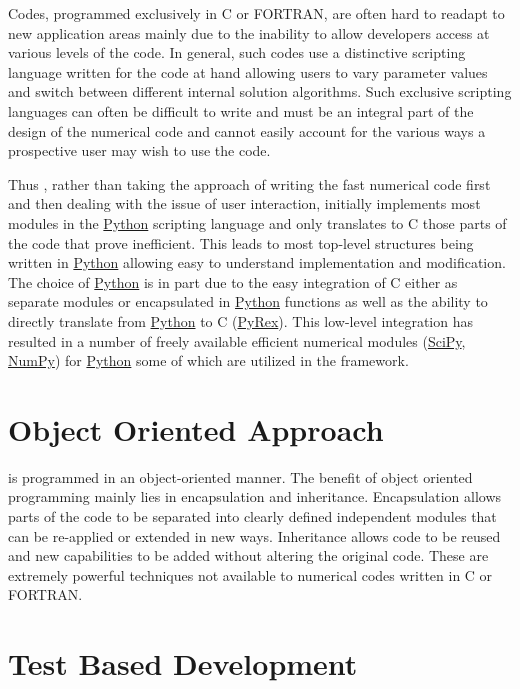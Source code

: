 Codes, programmed exclusively in C or FORTRAN, are often hard to
readapt to new application areas mainly due to the inability to allow
developers access at various levels of the code. In general, such
codes use a distinctive scripting language written for the code at
hand allowing users to vary parameter values and switch between
different internal solution algorithms. Such exclusive scripting
languages can often be difficult to write and must be an integral part
of the design of the numerical code and cannot easily account for the
various ways a prospective user may wish to use the code.

Thus \FiPy{}, rather than taking the approach of writing the fast
numerical code first and then dealing with the issue of user
interaction, initially implements most modules in the \href{http://www.python.org/}{Python} scripting
language and only translates to C those parts of the code that prove
inefficient. This leads to most top-level structures being written in
\href{http://www.python.org/}{Python} allowing easy to understand implementation and
modification. The choice of \href{http://www.python.org/}{Python} is
in part due to the easy integration of C either as separate modules or
encapsulated in \href{http://www.python.org/}{Python} functions as
well as the ability to directly translate from
\href{http://www.python.org/}{Python} to C
(\href{http://www.cosc.canterbury.ac.nz/~greg/python/Pyrex/}{PyRex}). This
low-level integration has resulted in a number of freely available
efficient numerical modules (\href{http://www.scipy.org/}{SciPy},
\href{http://www.numpy.org/}{NumPy}) for
\href{http://www.python.org/}{Python} some of which are utilized in
the \FiPy{} framework.

\section{Object Oriented Approach}

\FiPy{} is programmed in an object-oriented manner. The benefit of object
oriented programming mainly lies in encapsulation and
inheritance. Encapsulation allows parts of the code to be separated
into clearly defined independent modules that can be re-applied or
extended in new ways. Inheritance allows code to be reused and new
capabilities to be added without altering the original code. These are
extremely powerful techniques not available to numerical codes written
in C or FORTRAN.

\section{Test Based Development}

